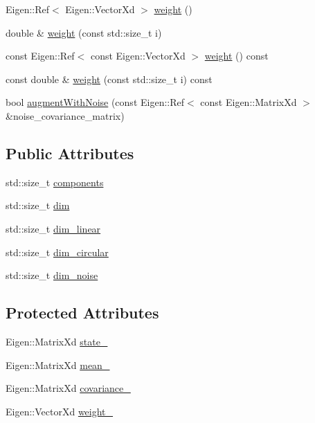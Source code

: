 \begin{DoxyCompactItemize}
\item 
Eigen\+::\+Ref$<$ Eigen\+::\+Vector\+Xd $>$ \mbox{\hyperlink{classbfl_1_1GaussianMixture_ada5625de6a3e2f98afb5aaa148503dad}{weight}} ()
\item 
double \& \mbox{\hyperlink{classbfl_1_1GaussianMixture_a44885fb208e33f37015d47f55d02ef50}{weight}} (const std\+::size\+\_\+t i)
\item 
const Eigen\+::\+Ref$<$ const Eigen\+::\+Vector\+Xd $>$ \mbox{\hyperlink{classbfl_1_1GaussianMixture_a9ef04270bbccfe01f481665a1f390167}{weight}} () const
\item 
const double \& \mbox{\hyperlink{classbfl_1_1GaussianMixture_a42672f88d9126f018715a4d258a57731}{weight}} (const std\+::size\+\_\+t i) const
\item 
bool \mbox{\hyperlink{classbfl_1_1GaussianMixture_aec4e807341e18c18faed041c41121cb7}{augment\+With\+Noise}} (const Eigen\+::\+Ref$<$ const Eigen\+::\+Matrix\+Xd $>$ \&noise\+\_\+covariance\+\_\+matrix)
\end{DoxyCompactItemize}
\subsection*{Public Attributes}
\begin{DoxyCompactItemize}
\item 
std\+::size\+\_\+t \mbox{\hyperlink{classbfl_1_1GaussianMixture_a02cc284327dbaa6b90c653dd2faccf88}{components}}
\item 
std\+::size\+\_\+t \mbox{\hyperlink{classbfl_1_1GaussianMixture_a3f2b18801e72fa3bf0d6edc778662a8d}{dim}}
\item 
std\+::size\+\_\+t \mbox{\hyperlink{classbfl_1_1GaussianMixture_a22a0fbc77f90d9d75e89d7898484c05a}{dim\+\_\+linear}}
\item 
std\+::size\+\_\+t \mbox{\hyperlink{classbfl_1_1GaussianMixture_a23f3b92753266475a9bff8ee7e1c9518}{dim\+\_\+circular}}
\item 
std\+::size\+\_\+t \mbox{\hyperlink{classbfl_1_1GaussianMixture_adaa8d9c6d03be835769cc848aba81067}{dim\+\_\+noise}}
\end{DoxyCompactItemize}
\subsection*{Protected Attributes}
\begin{DoxyCompactItemize}
\item 
Eigen\+::\+Matrix\+Xd \mbox{\hyperlink{classbfl_1_1ParticleSet_aa22f8487821f64e1428e37a82752c28e}{state\+\_\+}}
\item 
Eigen\+::\+Matrix\+Xd \mbox{\hyperlink{classbfl_1_1GaussianMixture_a12a1175e838a753129f4cc133b2c1a9c}{mean\+\_\+}}
\item 
Eigen\+::\+Matrix\+Xd \mbox{\hyperlink{classbfl_1_1GaussianMixture_aab086cc1a89a8b7efd15303853e52920}{covariance\+\_\+}}
\item 
Eigen\+::\+Vector\+Xd \mbox{\hyperlink{classbfl_1_1GaussianMixture_ac9ce000575d6b29ad8e1a756d750faff}{weight\+\_\+}}
\end{DoxyCompactItemize}


